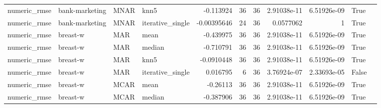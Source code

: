 \begin{table}[ht]
\begin{tabular}{llllrrrrrll}
 numeric\_rmse           & bank-marketing       & MNAR        & knn5             &     -0.113924    &                  36 &      36 & 2.91038e-11 & 6.51926e-09 & True               &                                                                                                                    \\
 numeric\_rmse           & bank-marketing       & MNAR        & iterative\_single &     -0.00395646  &                  24 &      36 & 0.0577062   & 1           & True               &                                                                                                                    \\
 numeric\_rmse           & breast-w             & MAR         & mean             &     -0.439975    &                  36 &      36 & 2.91038e-11 & 6.51926e-09 & True               &                                                                                                                    \\
 numeric\_rmse           & breast-w             & MAR         & median           &     -0.710791    &                  36 &      36 & 2.91038e-11 & 6.51926e-09 & True               &                                                                                                                    \\
 numeric\_rmse           & breast-w             & MAR         & knn5             &     -0.0910448   &                  36 &      36 & 2.91038e-11 & 6.51926e-09 & True               &                                                                                                                    \\
 numeric\_rmse           & breast-w             & MAR         & iterative\_single &      0.016795    &                   6 &      36 & 3.76924e-07 & 2.33693e-05 & False              &                                                                                                                    \\
 numeric\_rmse           & breast-w             & MCAR        & mean             &     -0.26113     &                  36 &      36 & 2.91038e-11 & 6.51926e-09 & True               &                                                                                                                    \\
 numeric\_rmse           & breast-w             & MCAR        & median           &     -0.387906    &                  36 &      36 & 2.91038e-11 & 6.51926e-09 & True               &                                                                                                                    \\

\end{tabular}
\end{table}
